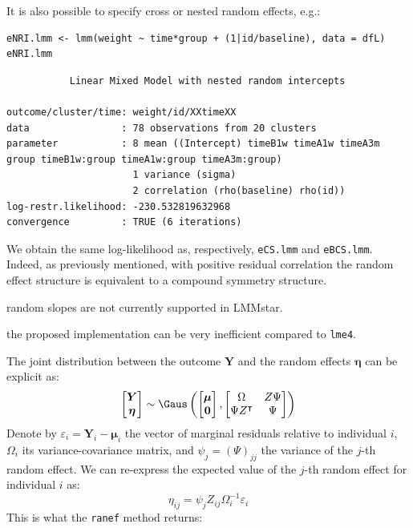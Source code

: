 \documentclass[12pt]{article}
\newcommand\Warning[1][3ex]{%
\renewcommand\stacktype{L}%
\scaleto{\stackon[1.3pt]{\color{red}$\triangle$}{\tiny\bfseries !}}{#1}%
\xspace
}
\newcommand\trans[1]{{#1}^\intercal}%
\newcommand\Veta{\boldsymbol{\eta}}
\newcommand{\VY}{\boldsymbol{Y}}
\begin{document}
It is also possible to specify cross or nested random effects, e.g.:

\lstset{language=r,label= ,caption= ,captionpos=b,numbers=none}
\begin{lstlisting}
eNRI.lmm <- lmm(weight ~ time*group + (1|id/baseline), data = dfL)
eNRI.lmm
\end{lstlisting}

\begin{verbatim}
	       Linear Mixed Model with nested random intercepts 

outcome/cluster/time: weight/id/XXtimeXX 
data                : 78 observations from 20 clusters 
parameter           : 8 mean ((Intercept) timeB1w timeA1w timeA3m group timeB1w:group timeA1w:group timeA3m:group) 
                      1 variance (sigma) 
                      2 correlation (rho(baseline) rho(id)) 
log-restr.likelihood: -230.532819632968 
convergence         : TRUE (6 iterations)
\end{verbatim}


We obtain the same log-likelihood as, respectively, \texttt{eCS.lmm} and
\texttt{eBCS.lmm}. Indeed, as previously mentioned, with positive residual
correlation the random effect structure is equivalent to a compound
symmetry structure. \newline \Warning random slopes are not currently
supported in LMMstar. \newline \Warning the proposed implementation can
be very inefficient compared to \texttt{lme4}.

\bigskip

The joint distribution between the outcome \(\VY\)
and the random effects \(\Veta\) can be explicit as:
\[
\begin{bmatrix} \VY \\ \Veta \end{bmatrix} \sim \Gaus\left(\begin{bmatrix} \boldsymbol{\mu} \\ \mathbf{0} \end{bmatrix}, \begin{bmatrix} \Omega & Z \Psi \\ \Psi \trans{Z} & \Psi \end{bmatrix}\right)
\]
Denote by \(\varepsilon_i=\VY_i-\boldsymbol{\mu}_i\) the vector of
marginal residuals relative to individual \(i\), \(\Omega_i\) its
variance-covariance matrix, and \(\psi_j=(\Psi)_{jj}\) the variance of the
\(j\)-th random effect. We can re-express the expected value of the
\(j\)-th random effect for individual \(i\) as:
\[ \eta_{ij} = \psi_{j} Z_{ij} \Omega_i^{-1}\varepsilon_i \]
This is what the \texttt{ranef} method returns:
\end{document}
